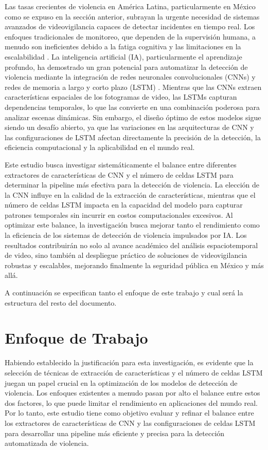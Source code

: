 Las tasas crecientes de violencia en América Latina, 
particularmente en México como se expuso en la sección anterior, 
subrayan la urgente necesidad de sistemas avanzados de 
videovigilancia capaces de detectar incidentes en tiempo real. 
Los enfoques tradicionales de monitoreo, que dependen de la supervisión 
humana, a menudo son ineficientes debido a la fatiga cognitiva y 
las limitaciones en la escalabilidad \cite{Marois2021}. La inteligencia 
artificial (IA), particularmente el aprendizaje profundo, ha demostrado 
un gran potencial para automatizar la detección de violencia mediante 
la integración de redes neuronales convolucionales (CNNs) y redes de 
memoria a largo y corto plazo (LSTM) \cite{Negre2024,Negre20242,Abdali2019,Sharma2021}. 
Mientras que las CNNs extraen características espaciales de los 
fotogramas de video, las LSTMs capturan dependencias temporales, 
lo que las convierte en una combinación poderosa para analizar 
escenas dinámicas. Sin embargo, el diseño óptimo de estos modelos 
sigue siendo un desafío abierto, ya que las variaciones en las 
arquitecturas de CNN y las configuraciones de LSTM afectan directamente 
la precisión de la detección, la eficiencia computacional y la aplicabilidad 
en el mundo real.

Este estudio busca investigar sistemáticamente el balance 
entre diferentes extractores de características de CNN y el número 
de celdas LSTM para determinar la pipeline más efectiva para la 
detección de violencia. La elección de la CNN influye en la calidad 
de la extracción de características, mientras que el número de celdas 
LSTM impacta en la capacidad del modelo para capturar patrones temporales 
sin incurrir en costos computacionales excesivos. Al optimizar este 
balance, la investigación busca mejorar tanto el rendimiento como 
la eficiencia de los sistemas de detección de violencia impulsados por IA. 
Los resultados contribuirán no solo al avance académico del análisis 
espaciotemporal de video, sino también al despliegue práctico de soluciones 
de videovigilancia robustas y escalables, mejorando finalmente la seguridad 
pública en México y más allá.

A continuación se especifican tanto el enfoque de este 
trabajo y cual será la estructura del resto del 
documento.

\section{Enfoque de Trabajo}

Habiendo establecido la justificación para esta investigación, 
es evidente que la selección de técnicas de extracción de 
características y el número de celdas LSTM juegan un papel crucial 
en la optimización de los modelos de detección de violencia. Los enfoques 
existentes a menudo pasan por alto el balance entre estos dos factores, 
lo que puede limitar el rendimiento en aplicaciones del mundo real. 
Por lo tanto, este estudio tiene como objetivo evaluar y refinar 
el balance entre los extractores de características de CNN y las 
configuraciones de celdas LSTM para desarrollar una pipeline más 
eficiente y precisa para la detección automatizada de violencia.

